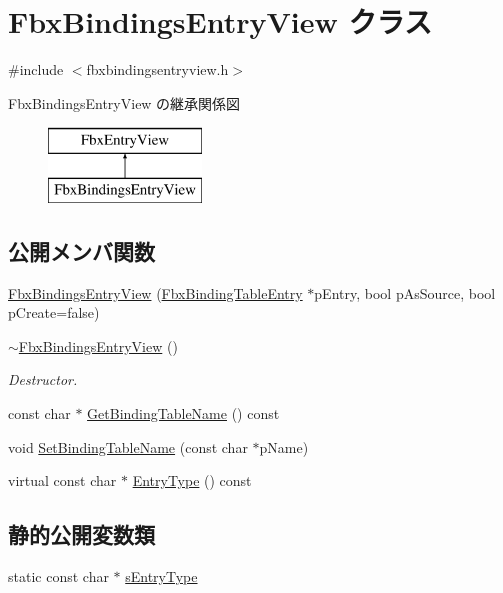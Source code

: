 \hypertarget{class_fbx_bindings_entry_view}{}\section{Fbx\+Bindings\+Entry\+View クラス}
\label{class_fbx_bindings_entry_view}


{\ttfamily \#include $<$fbxbindingsentryview.\+h$>$}

Fbx\+Bindings\+Entry\+View の継承関係図\begin{figure}[H]
\begin{center}
\leavevmode
\includegraphics[height=2.000000cm]{class_fbx_bindings_entry_view}
\end{center}
\end{figure}
\subsection*{公開メンバ関数}
\begin{DoxyCompactItemize}
\item 
\hyperlink{class_fbx_bindings_entry_view_a9ed299bf864d23bf17b1ab1d16a1d3d6}{Fbx\+Bindings\+Entry\+View} (\hyperlink{class_fbx_binding_table_entry}{Fbx\+Binding\+Table\+Entry} $\ast$p\+Entry, bool p\+As\+Source, bool p\+Create=false)
\item 
\hyperlink{class_fbx_bindings_entry_view_a82b1df38bb6aeb6548e6edbed48c3f8b}{$\sim$\+Fbx\+Bindings\+Entry\+View} ()
\begin{DoxyCompactList}\small\item\em Destructor. \end{DoxyCompactList}\item 
const char $\ast$ \hyperlink{class_fbx_bindings_entry_view_a1b3909ebdbe0164c910056526eedcdc6}{Get\+Binding\+Table\+Name} () const
\item 
void \hyperlink{class_fbx_bindings_entry_view_af367ef628865d839cc034acf224ffe78}{Set\+Binding\+Table\+Name} (const char $\ast$p\+Name)
\item 
virtual const char $\ast$ \hyperlink{class_fbx_bindings_entry_view_a25f821ea63f19592173e7785356c04f9}{Entry\+Type} () const
\end{DoxyCompactItemize}
\subsection*{静的公開変数類}
\begin{DoxyCompactItemize}
\item 
static const char $\ast$ \hyperlink{class_fbx_bindings_entry_view_a209f878b5007e944ca37fb6f73139c2e}{s\+Entry\+Type}
\end{DoxyCompactItemize}
